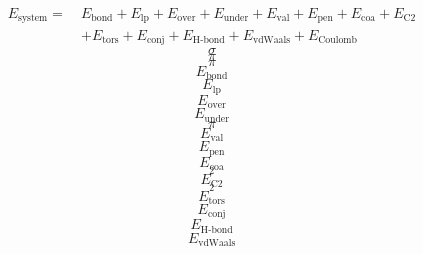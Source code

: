 \documentclass{scrreprt}
\begin{document}
\begin{align}
  \label{reaxformulation}
  E_\text{system} =~& E_\text{bond} + E_\text{lp} + E_\text{over} + E_\text{under} + E_\text{val} + E_\text{pen} + E_\text{coa} + E_\text{C2} \\
  \nonumber  & + E_\text{tors} + E_\text{conj} + E_\text{H-bond} + E_\text{vdWaals} + E_\text{Coulomb}
\end{align}
\begin{equation}
\sigma
\end{equation}
\begin{equation}
\pi
\end{equation}
\begin{equation}
\pi
\end{equation}
\begin{equation}
E_\text{bond}
\end{equation}
\begin{equation}
E_\text{lp}
\end{equation}
\begin{equation}
E_\text{over}
\end{equation}
\begin{equation}
E_\text{under}
\end{equation}
\begin{equation}
\pi
\end{equation}
\begin{equation}
E_\text{val}
\end{equation}
\begin{equation}
E_\text{pen}
\end{equation}
\begin{equation}
E_\text{coa}
\end{equation}
\begin{equation}
_2
\end{equation}
\begin{equation}
E_\text{C2}
\end{equation}
\begin{equation}
_2
\end{equation}
\begin{equation}
E_\text{tors}
\end{equation}
\begin{equation}
E_\text{conj}
\end{equation}
\begin{equation}
E_\text{H-bond}
\end{equation}
\begin{equation}
E_\text{vdWaals}
\end{equation}
\end{document}
